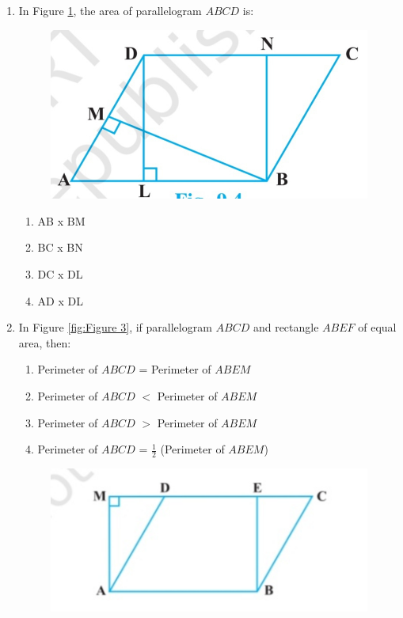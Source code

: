 \documentclass{article}
\begin{document}
\begin{enumerate}
\item In Figure \ref{fig:Figure 2}, the area of parallelogram $ABCD$ is:
\begin{figure}[!h]
\begin{center}
\includegraphics[width=\columnwidth]{figs/four.jpg}
\caption{}
\label{fig:Figure 2}
\end{center}
\end{figure}
\begin{enumerate}
\item AB x BM
\item BC x BN
\item DC x DL
\item AD x DL
\end{enumerate}
\item In Figure \eqref{fig:Figure 3}, if parallelogram $ABCD$ and rectangle $ABEF$ of equal area, then:
\begin{enumerate}
\item Perimeter of $ABCD$ = Perimeter of $ABEM$
\item Perimeter of $ABCD$ $<$ Perimeter of $ABEM$
\item Perimeter of $ABCD$ $>$ Perimeter of $ABEM$
\item Perimeter of $ABCD$ = $\frac{1}{2}$ (Perimeter of $ABEM$)
\end{enumerate}
\begin{figure}[!h]
\begin{center}
\includegraphics[width=\columnwidth]{figs/five.jpg}

\end{center}
\end{figure}
\end{enumerate}
\end{document}
